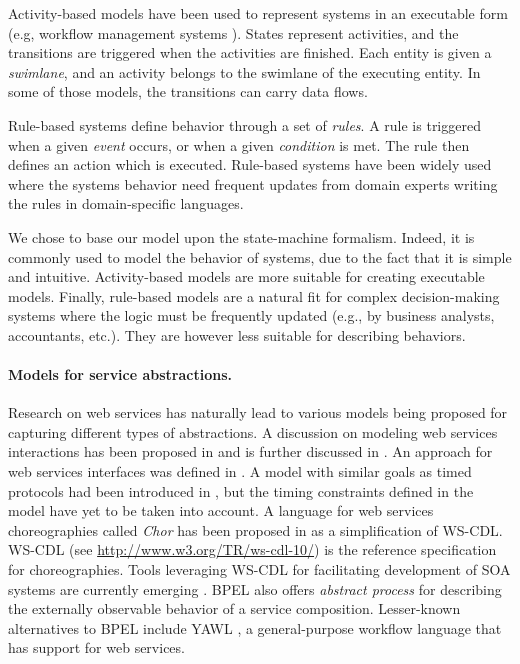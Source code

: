 Activity-based models have been used to represent systems in an executable form (e.g, workflow management systems \cite{aalst98application}). States represent activities, and the transitions are triggered when the activities are finished. Each entity is given a \emph{swimlane}, and an activity belongs to the swimlane of the executing entity. In some of those models, the transitions can carry data flows.

Rule-based systems \cite{Forgy79,Forgy82} define behavior through a set of \emph{rules}. A rule is triggered when a given \emph{event} occurs, or when a given \emph{condition} is met. The rule then defines an action which is executed. Rule-based systems have been widely used where the systems behavior need frequent updates from domain experts writing the rules in domain-specific languages.

We chose to base our model upon the state-machine formalism. Indeed, it is commonly used to model the behavior of systems, due to the fact that it is simple and intuitive. Activity-based models are more suitable for creating executable models. Finally, rule-based models are a natural fit for complex decision-making systems where the logic must be frequently updated (e.g., by business analysts, accountants, etc.). They are however less suitable for describing behaviors.

\paragraph{Models for service abstractions.}
Research on web services has naturally lead to various models being proposed for capturing different types of abstractions. A discussion on modeling web services interactions has been proposed in \cite{TB-WWV06} and is further discussed in \cite{BSF06}. An approach for web services interfaces was defined in \cite{DBACTH05}. A model with similar goals as timed protocols had been introduced in \cite{berardi03finite}, but the timing constraints defined in the model have yet to be taken into account. A language for web services choreographies called \emph{Chor} has been proposed in \cite{QZCY-WWW07} as a simplification of WS-CDL.
WS-CDL (see \url{http://www.w3.org/TR/ws-cdl-10/}) is the reference specification for choreographies. Tools leveraging WS-CDL for facilitating development of SOA systems are currently emerging \cite{KangWH07}. BPEL also offers \emph{abstract process} for describing the externally observable behavior of a service composition. Lesser-known alternatives to BPEL include YAWL \cite{AalstADH04,AalstH05}, a general-purpose workflow language that has support for web services.

